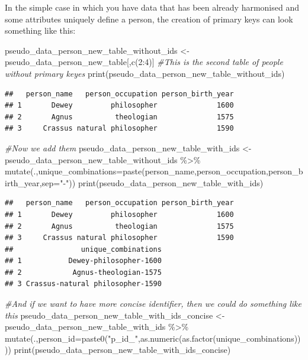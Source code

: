 \documentclass[
]{book}
\newenvironment{Shaded}{\begin{snugshade}}{\end{snugshade}}
\newcommand{\AttributeTok}[1]{\textcolor[rgb]{0.77,0.63,0.00}{#1}}
\newcommand{\CommentTok}[1]{\textcolor[rgb]{0.56,0.35,0.01}{\textit{#1}}}
\newcommand{\DecValTok}[1]{\textcolor[rgb]{0.00,0.00,0.81}{#1}}
\newcommand{\FunctionTok}[1]{\textcolor[rgb]{0.00,0.00,0.00}{#1}}
\newcommand{\NormalTok}[1]{#1}
\newcommand{\OtherTok}[1]{\textcolor[rgb]{0.56,0.35,0.01}{#1}}
\newcommand{\SpecialCharTok}[1]{\textcolor[rgb]{0.00,0.00,0.00}{#1}}
\newcommand{\StringTok}[1]{\textcolor[rgb]{0.31,0.60,0.02}{#1}}
\begin{document}
In the simple case in which you have data that has been already harmonised and some attributes uniquely define a person, the creation of primary keys can look something like this:

\begin{Shaded}
\begin{Highlighting}[]
\NormalTok{pseudo\_data\_person\_new\_table\_without\_ids }\OtherTok{\textless{}{-}}\NormalTok{ pseudo\_data\_person\_new\_table[,}\FunctionTok{c}\NormalTok{(}\DecValTok{2}\SpecialCharTok{:}\DecValTok{4}\NormalTok{)]}
\CommentTok{\#This is the second table of people without primary keyes}
\FunctionTok{print}\NormalTok{(pseudo\_data\_person\_new\_table\_without\_ids)}
\end{Highlighting}
\end{Shaded}

\begin{verbatim}
##   person_name   person_occupation person_birth_year
## 1       Dewey         philosopher              1600
## 2       Agnus          theologian              1575
## 3     Crassus natural philosopher              1590
\end{verbatim}

\begin{Shaded}
\begin{Highlighting}[]
\CommentTok{\#Now we add them}
\NormalTok{pseudo\_data\_person\_new\_table\_with\_ids }\OtherTok{\textless{}{-}}\NormalTok{ pseudo\_data\_person\_new\_table\_without\_ids }\SpecialCharTok{\%\textgreater{}\%} \FunctionTok{mutate}\NormalTok{(.,}\AttributeTok{unique\_combinations=}\FunctionTok{paste}\NormalTok{(person\_name,person\_occupation,person\_birth\_year,}\AttributeTok{sep=}\StringTok{"{-}"}\NormalTok{))}
\FunctionTok{print}\NormalTok{(pseudo\_data\_person\_new\_table\_with\_ids)}
\end{Highlighting}
\end{Shaded}

\begin{verbatim}
##   person_name   person_occupation person_birth_year
## 1       Dewey         philosopher              1600
## 2       Agnus          theologian              1575
## 3     Crassus natural philosopher              1590
##                unique_combinations
## 1           Dewey-philosopher-1600
## 2            Agnus-theologian-1575
## 3 Crassus-natural philosopher-1590
\end{verbatim}

\begin{Shaded}
\begin{Highlighting}[]
\CommentTok{\#And if we want to have more concise identifier, then we could do something like this}
\NormalTok{pseudo\_data\_person\_new\_table\_with\_ids\_concise }\OtherTok{\textless{}{-}}\NormalTok{ pseudo\_data\_person\_new\_table\_with\_ids }\SpecialCharTok{\%\textgreater{}\%} \FunctionTok{mutate}\NormalTok{(.,}\AttributeTok{person\_id=}\FunctionTok{paste0}\NormalTok{(}\StringTok{"p\_id\_"}\NormalTok{,}\FunctionTok{as.numeric}\NormalTok{(}\FunctionTok{as.factor}\NormalTok{(unique\_combinations))))}
\FunctionTok{print}\NormalTok{(pseudo\_data\_person\_new\_table\_with\_ids\_concise)}
\end{Highlighting}
\end{Shaded}
\end{document}
